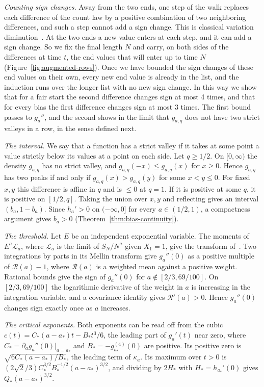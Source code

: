 \emph{Counting sign changes.} Away from the two ends, one step of the
walk replaces each difference of the count law by a positive
combination of two neighboring differences, and such a step cannot add
a sign change. This is classical variation
diminution~\cite{karlin1968,karlin1964}. At the two ends a new value
enters at each step, and it can add a sign change. So we fix the final
length $N$ and carry, on both sides of the differences at time $t$, the
end values that will enter up to time $N$
(Figure~\ref{fig:augmented-rows}). Once we have bounded the sign
changes of these end values on their own, every new end value is
already in the list, and the induction runs over the longer list with
no new sign change. In this way we show that for a fair start the
second difference changes sign at most 4 times, and that for every
bias the first difference changes sign at most 3 times. The first
bound passes to $g_a''$, and the second shows in the limit that
$g_{a,q}$ does not have two strict valleys in a row, in the sense
defined next.

\emph{The interval.} We say that a function has a strict valley if it
takes at some point a value strictly below its values at a point on
each side. Let $q\ge1/2$. On $[0,\infty)$ the density $g_{a,q}$ has no
strict valley, and $g_{a,q}(-x)\le g_{a,q}(x)$ for $x\ge0$. Hence $g_{a,q}$ has two
peaks if and only if $g_{a,q}(x)>g_{a,q}(y)$ for some $x<y\le0$. For
fixed $x,y$ this difference is affine in $q$ and is $\le0$ at $q=1$. If
it is positive at some $q$, it is positive on $[1/2,q]$. Taking the
union over $x,y$ and reflecting gives an interval $(b_a,1-b_a)$. Since
$h_a'>0$ on $(-\infty,0]$ for every $a\in(1/2,1)$, a compactness
argument gives $b_a>0$ (Theorem~\ref{thm:bias-continuity}).

\emph{The threshold.} Let $E$ be an independent exponential variable.
The moments of $E^a\mathcal L_a$, where $\mathcal L_a$ is the limit of
$S_N/N^a$ given $X_1=1$, give the transform
of~\cite[Proposition~3.2]{glrs2025}. Two integrations by parts in its
Mellin transform give $g_a''(0)$ as a positive multiple of
$\mathcal R(a)-1$, where $\mathcal R(a)$ is a weighted mean against a
positive weight. Rational bounds give the sign of $g_a''(0)$ for
$a\notin[2/3,69/100]$. On $[2/3,69/100]$ the logarithmic derivative of
the weight in $a$ is increasing in the integration variable, and a
covariance identity gives $\mathcal R'(a)>0$. Hence $g_a''(0)$ changes
sign exactly once as $a$ increases.

\emph{The critical exponents.} Both exponents can be read off from the
cubic $c(t)=C_*(a-a_*)t-B_*t^3/6$, the leading part of $g_a'(t)$ near
zero, where $C_*=\partial_ag_a''(0)|_{a=a_*}$ and
$B_*=-g_{a_*}^{(4)}(0)$ are positive. Its positive zero is
$\sqrt{6C_*(a-a_*)/B_*}$, the leading term of $\kappa_a$. Its maximum
over $t>0$ is $(2\sqrt2/3)C_*^{3/2}B_*^{-1/2}(a-a_*)^{3/2}$, and
dividing by $2H_*$ with $H_*=h_{a_*}'(0)$ gives $Q_*(a-a_*)^{3/2}$.

